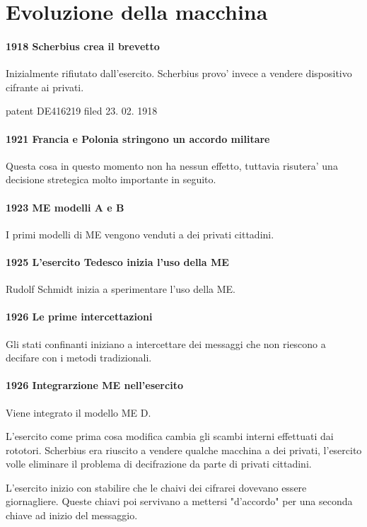 \section{Evoluzione della macchina}

\paragraph{1918 Scherbius crea il brevetto}
Inizialmente rifiutato dall'esercito.
Scherbius provo' invece a vendere dispositivo cifrante ai privati.

patent DE416219 filed 23. 02. 1918

\paragraph{1921 Francia e Polonia stringono un accordo militare}
Questa cosa in questo momento non ha nessun effetto, tuttavia risutera'
una decisione stretegica molto importante in seguito.

\paragraph{1923 ME modelli A e B}
I primi modelli di ME vengono venduti a dei privati cittadini.

\paragraph{1925 L'esercito Tedesco inizia l'uso della ME}
Rudolf Schmidt inizia a sperimentare l'uso della ME.

\paragraph{1926 Le prime intercettazioni}
Gli stati confinanti iniziano a intercettare dei messaggi
che non riescono a decifare con i metodi tradizionali.

\paragraph{1926 Integrarzione ME nell'esercito}
Viene integrato il modello ME D.

L'esercito come prima cosa modifica cambia gli scambi interni
effettuati dai rototori.
Scherbius era riuscito a vendere qualche macchina a dei privati,
l'esercito volle eliminare il problema di decifrazione da parte di
privati cittadini.

L'esercito inizio con stabilire che le chaivi dei cifrarei dovevano essere giornagliere.
Queste chiavi poi servivano a mettersi "d'accordo" per una seconda chiave ad inizio del messaggio.

